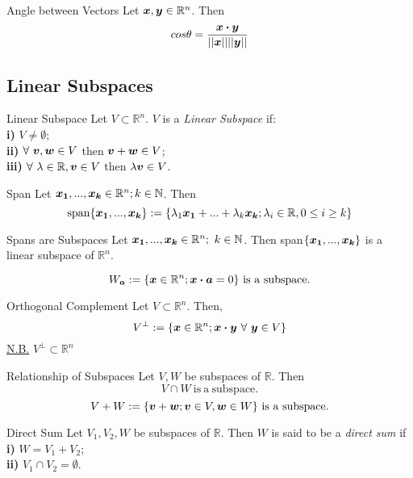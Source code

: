 \documentclass[11pt,a4paper]{article}
\begin{document}
\subtitle{Theorem 2.10 - }{Angle between Vectors}
Let $\boldsymbol{x}, \boldsymbol{y} \in \mathbb{R}^n$. Then $$cos\theta = \frac{\boldsymbol{x} \boldsymbol{\cdot} \boldsymbol{y}}{||\boldsymbol{x}|| ||\boldsymbol{y}||}$$

\subsection{Linear Subspaces}
%
\subtitle{Definition 2.11 - }{Linear Subspace}
Let $V \subset \mathbb{R}^n$. $V$ is a \textit{Linear Subspace} if: \\
\textbf{i)} $V \not = \emptyset$; \\
\textbf{ii)} $\forall\ \boldsymbol{v}, \boldsymbol{w} \in V$ then $\boldsymbol{v} + \boldsymbol{w} \in V$; \\
\textbf{iii)} $\forall\ \lambda \in \mathbb{R}, \boldsymbol{v} \in V$ then $\lambda\boldsymbol{v} \in V$. \\

\subtitle{Definition 2.12 - }{Span}
Let $\boldsymbol{x_1}, ... , \boldsymbol{x_k} \in \mathbb{R}^n; k \in \mathbb{N}$. Then
$$\mathrm{span}\{\boldsymbol{x_1}, ... , \boldsymbol{x_k}\} := \{\lambda_1\boldsymbol{x_1} + ... + \lambda_k\boldsymbol{x_k}; \lambda_i \in \mathbb{R}, 0 \leq i \geq k\}$$

\subtitle{Definition 2.13 - }{Spans are Subspaces}
Let $\boldsymbol{x_1}, ... , \boldsymbol{x_k} \in \mathbb{R}^n;\ k \in \mathbb{N}$. Then span$\{\boldsymbol{x_1}, ... , \boldsymbol{x_k}\}$ is a linear subspace of $\mathbb{R}^n$. \\

\subtitle{Theorem 2.14}{}
$$W_{\vect{a}} := \{\vect{x} \in \mathbb{R}^n; \vect{x} \dotprod \vect{a} = 0\}\mathrm{\ is\ a\ subspace.}$$

\subtitle{Definition 2.15 - }{Orthogonal Complement}
Let $V \subset \mathbb{R}^n$. Then,
$$V^{\perp} := \{\boldsymbol{x} \in \mathbb{R}^n; \boldsymbol{x} \boldsymbol{\cdot} \boldsymbol{y}\ \forall\ \boldsymbol{y} \in V\}$$
\underline{N.B.} $V^{\perp} \subset \mathbb{R}^n$

\subtitle{Theorem 2.16 - }{Relationship of Subspaces}
Let $V, W$ be subspaces of $\mathbb{R}$. Then
$$V \cap W \mathrm{\ is\ a\ subspace.}$$
$$V+W := \{\boldsymbol{v} + \boldsymbol{w}; \boldsymbol{v} \in V, \boldsymbol{w} \in W\}\mathrm{\ is\ a\ subspace.}$$

\subtitle{Definition 2.17 - }{Direct Sum}
Let $V_1, V_2, W$ be subspaces of $\mathbb{R}$. Then $W$ is said to be a \textit{direct sum} if \\
\textbf{i)} $W = V_1 + V_2$; \\
\textbf{ii)} $V_1 \cap V_2 = \emptyset$. \\
\end{document}
